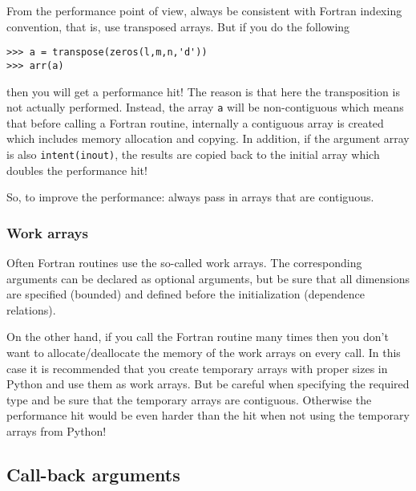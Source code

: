 From the performance point of view, always be consistent with Fortran
indexing convention, that is, use transposed arrays. But if you do the
following
\begin{verbatim}
>>> a = transpose(zeros(l,m,n,'d'))
>>> arr(a)
\end{verbatim}
then you will get a performance hit! The reason is that here the
transposition is not actually performed. Instead, the array \texttt{a}
will be non-contiguous which means that before calling a Fortran
routine, internally a contiguous array is created which
includes memory allocation and copying. In addition, if
the argument array is also \texttt{intent(inout)}, the results are
copied  back to the initial array which doubles the
performance hit!

So, to improve the performance: always pass in
arrays that are contiguous.

\subsubsection{Work arrays}

Often Fortran routines use the so-called work arrays. The
corresponding arguments can be declared as optional arguments, but be
sure that all dimensions are specified (bounded) and defined before
the initialization (dependence relations).

On the other hand, if you call the Fortran routine many times then you
don't want to allocate/deallocate the memory of the work arrays on
every call. In this case it is recommended that you create temporary
arrays with proper sizes in Python and use them as work arrays. But be
careful when specifying the required type and be sure that the
temporary arrays are contiguous. Otherwise the performance hit would
be even harder than the hit when not using the temporary arrays from
Python!



\subsection{Call-back arguments}
\label{sec:cbargs}

